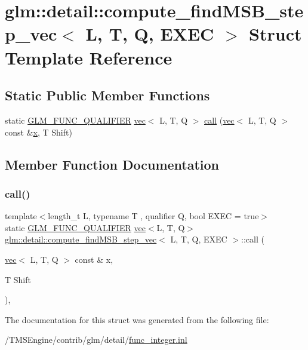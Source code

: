 \hypertarget{structglm_1_1detail_1_1compute__find_m_s_b__step__vec}{}\section{glm\+:\+:detail\+:\+:compute\+\_\+find\+M\+S\+B\+\_\+step\+\_\+vec$<$ L, T, Q, E\+X\+EC $>$ Struct Template Reference}
\label{structglm_1_1detail_1_1compute__find_m_s_b__step__vec}
\subsection*{Static Public Member Functions}
\begin{DoxyCompactItemize}
\item 
static \hyperlink{setup_8hpp_a33fdea6f91c5f834105f7415e2a64407}{G\+L\+M\+\_\+\+F\+U\+N\+C\+\_\+\+Q\+U\+A\+L\+I\+F\+I\+ER} \hyperlink{structglm_1_1vec}{vec}$<$ L, T, Q $>$ \hyperlink{structglm_1_1detail_1_1compute__find_m_s_b__step__vec_ad2bb7c372d1a7b44269af72d8f7dbc73}{call} (\hyperlink{structglm_1_1vec}{vec}$<$ L, T, Q $>$ const \&\hyperlink{_s_d_l__opengl_8h_ad0e63d0edcdbd3d79554076bf309fd47}{x}, T Shift)
\end{DoxyCompactItemize}


\subsection{Member Function Documentation}
\mbox{\label{structglm_1_1detail_1_1compute__find_m_s_b__step__vec_ad2bb7c372d1a7b44269af72d8f7dbc73}} 
\subsubsection{\texorpdfstring{call()}{call()}}
{\footnotesize\ttfamily template$<$length\+\_\+t L, typename T , qualifier Q, bool E\+X\+EC = true$>$ \\
static \hyperlink{setup_8hpp_a33fdea6f91c5f834105f7415e2a64407}{G\+L\+M\+\_\+\+F\+U\+N\+C\+\_\+\+Q\+U\+A\+L\+I\+F\+I\+ER} \hyperlink{structglm_1_1vec}{vec}$<$L, T, Q$>$ \hyperlink{structglm_1_1detail_1_1compute__find_m_s_b__step__vec}{glm\+::detail\+::compute\+\_\+find\+M\+S\+B\+\_\+step\+\_\+vec}$<$ L, T, Q, E\+X\+EC $>$\+::call (\begin{DoxyParamCaption}\item[{\hyperlink{structglm_1_1vec}{vec}$<$ L, T, Q $>$ const \&}]{x,  }\item[{T}]{Shift }\end{DoxyParamCaption})\hspace{0.3cm}{\ttfamily [inline]}, {\ttfamily [static]}}



The documentation for this struct was generated from the following file\+:\begin{DoxyCompactItemize}
\item 
/\+T\+M\+S\+Engine/contrib/glm/detail/\hyperlink{func__integer_8inl}{func\+\_\+integer.\+inl}\end{DoxyCompactItemize}
